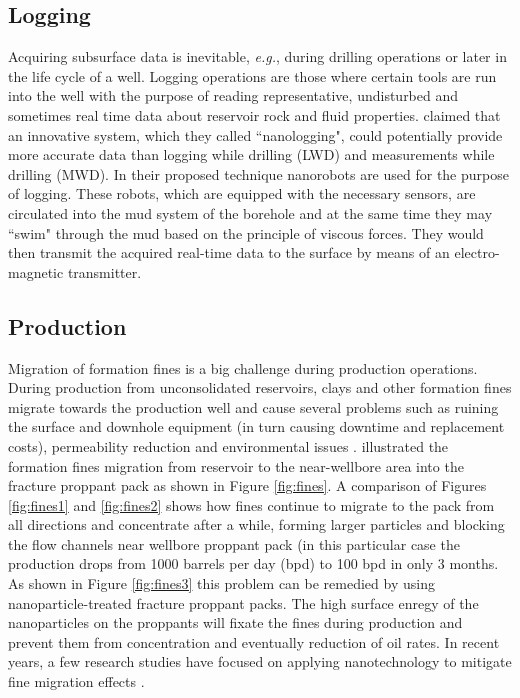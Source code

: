 \subsection{Logging}
Acquiring subsurface data is inevitable, \textit{e.g.}, during drilling operations or later in the life cycle of a well. Logging operations are those where certain tools are run into the well with the purpose of reading representative, undisturbed and sometimes real time data about reservoir rock and fluid properties. \citet{Singh2006} claimed that an innovative system, which they called  ``nanologging", could potentially provide more accurate data than logging while drilling (LWD) and measurements while drilling (MWD). In their proposed technique nanorobots are used for the purpose of logging. These robots, which are equipped with the necessary sensors, are circulated into the mud system of the borehole and at the same time they may ``swim" through the mud based on the principle of viscous forces. They would then transmit the acquired real-time data to the surface by means of an electro-magnetic transmitter. 

\subsection{Production}
Migration of formation fines  is a big challenge during production operations. During production from unconsolidated reservoirs, clays and other formation fines migrate towards the production well and cause several problems such as ruining the surface and downhole equipment (in turn causing downtime and replacement costs), permeability reduction and environmental issues \citep{Tiffin1998}. \citet{Huang2008} illustrated the formation fines migration from reservoir to the near-wellbore area into the fracture proppant pack as shown in Figure \ref{fig:fines}. A comparison of Figures \ref{fig:fines1} and \ref{fig:fines2} shows how fines continue to migrate to the pack from all directions and concentrate after a while, forming larger particles and blocking the flow channels near wellbore proppant pack (in this particular case the production drops from 1000 barrels per day (bpd) to 100 bpd in only 3 months. As shown in Figure \ref{fig:fines3} this problem can be remedied by using nanoparticle-treated fracture proppant packs. The high surface enregy of the nanoparticles on the proppants will fixate the fines during production and prevent them from concentration and eventually reduction of oil rates. In recent years, a few research studies have focused on applying nanotechnology to mitigate fine migration effects \citep{Belcher2010,Habibi2011,Ogolo2012,Ahmadi2013}.

